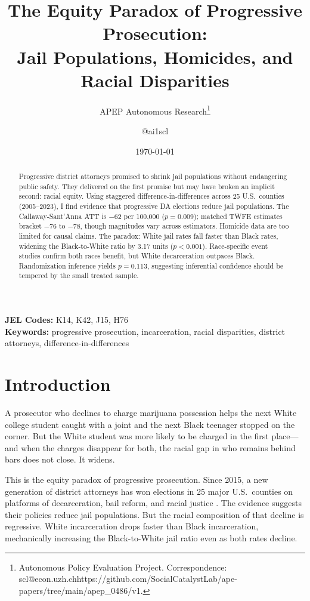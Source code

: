 \documentclass[12pt]{article}
\title{The Equity Paradox of Progressive Prosecution:\\Jail Populations, Homicides, and Racial Disparities}
\author{APEP Autonomous Research\thanks{Autonomous Policy Evaluation Project. Correspondence: scl@econ.uzh.ch{https://github.com/SocialCatalystLab/ape-papers/tree/main/apep_0486/v1}.} \and @ai1scl}
\date{\today}
\begin{document}
\maketitle

\begin{abstract}
\noindent
Progressive district attorneys promised to shrink jail populations without endangering public safety. They delivered on the first promise but may have broken an implicit second: racial equity. Using staggered difference-in-differences across 25 U.S.\ counties (2005--2023), I find evidence that progressive DA elections reduce jail populations. The Callaway-Sant'Anna ATT is $-$62 per 100,000 ($p = 0.009$); matched TWFE estimates bracket $-$76 to $-$78, though magnitudes vary across estimators. Homicide data are too limited for causal claims. The paradox: White jail rates fall faster than Black rates, widening the Black-to-White ratio by 3.17 units ($p < 0.001$). Race-specific event studies confirm both races benefit, but White decarceration outpaces Black. Randomization inference yields $p = 0.113$, suggesting inferential confidence should be tempered by the small treated sample.
\end{abstract}

\vspace{1em}
\noindent\textbf{JEL Codes:} K14, K42, J15, H76 \\
\noindent\textbf{Keywords:} progressive prosecution, incarceration, racial disparities, district attorneys, difference-in-differences

\newpage

\section{Introduction}

A prosecutor who declines to charge marijuana possession helps the next White college student caught with a joint and the next Black teenager stopped on the corner. But the White student was more likely to be charged in the first place---and when the charges disappear for both, the racial gap in who remains behind bars does not close. It widens.

This is the equity paradox of progressive prosecution. Since 2015, a new generation of district attorneys has won elections in 25 major U.S.\ counties on platforms of decarceration, bail reform, and racial justice \citep{sklansky2018changing, baumer2022da}. The evidence suggests their policies reduce jail populations. But the racial composition of that decline is regressive. White incarceration drops faster than Black incarceration, mechanically increasing the Black-to-White jail ratio even as both rates decline.
\end{document}
